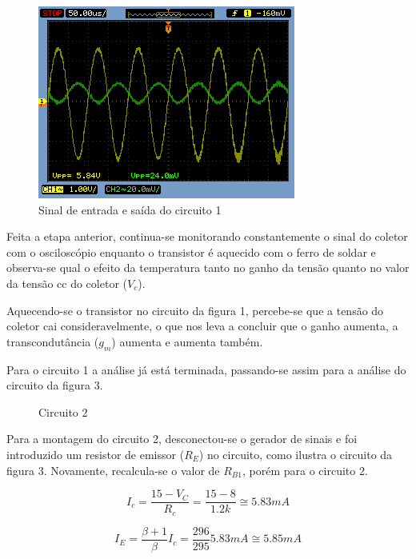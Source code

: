 \documentclass[a4paper]{article} %
\begin{document}
\begin{figure}[h!]
\begin{centering}
\includegraphics[scale=0.5]{figuras03/1_1} \caption{Sinal de entrada e saída do circuito 1 \label{fig:11}}
\par\end{centering}
\end{figure}


Feita a etapa anterior, continua-se monitorando constantemente o sinal do coletor
com o osciloscópio enquanto o transistor é aquecido com o ferro de soldar e observa-se qual o
efeito da temperatura tanto no ganho da tensão quanto no valor da tensão cc do coletor ($V_c$).

Aquecendo-se o transistor no circuito da figura 1, percebe-se que a tensão do coletor
cai consideravelmente, o que nos leva a concluir que o ganho aumenta, a transcondutância
($g_m$) aumenta e aumenta também.

Para o circuito 1 a análise já está terminada, passando-se assim para a análise do
circuito da figura 3.


\vspace{3mm}
\begin{figure}[h!]
\centerline{}
\caption{Circuito 2\label{circ:2}}
\end{figure}

Para a montagem do circuito 2, desconectou-se o gerador de sinais e foi introduzido
um resistor de emissor ($R_E$) no circuito, como ilustra o circuito da figura 3. Novamente,
recalcula-se o valor de $R_{B1}$, porém para o circuito 2.

\begin{displaymath}
I_c=\frac{15-V_C}{R_c}=\frac{15-8}{1.2k}\cong5.83mA
\end{displaymath}

\begin{displaymath}
I_E=\frac{\beta +1}{\beta}I_c=\frac{296}{295}5.83mA\cong5.85mA
\end{displaymath}
\end{document}
